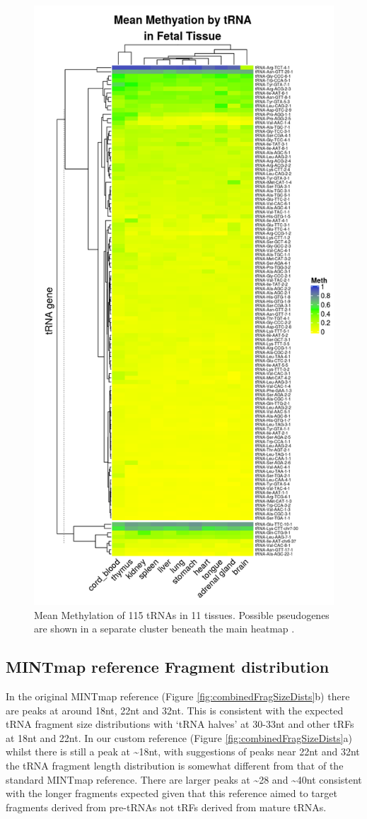 \documentclass[
]{book}
\begin{document}
\begin{figure}

{\centering \includegraphics[width=0.6\linewidth]{./figs/meanMethBytRNAByFetalTissueHeatmapPseudosplit} 

}

\caption{Mean Methylation of 115 tRNAs in 11 tissues. Possible pseudogenes are shown in a separate cluster beneath the main heatmap \citep{Gu2016}.}\label{fig:meanMethBytRNAByFetalTissueHeatmap}
\end{figure}



\hypertarget{mintmap-reference-fragment-distribution}{%
\subsection{MINTmap reference Fragment distribution}\label{mintmap-reference-fragment-distribution}}

In the original MINTmap reference (Figure \ref{fig:combinedFragSizeDists}b) there are peaks at around 18nt, 22nt and 32nt.
This is consistent with the expected tRNA fragment size distributions with `tRNA halves' at 30-33nt and other tRFs at 18nt and 22nt.
In our custom reference (Figure \ref{fig:combinedFragSizeDists}a) whilst there is still a peak at \textasciitilde18nt, with suggestions of peaks near 22nt and 32nt the tRNA fragment length distribution is somewhat different from that of the standard MINTmap reference.
There are larger peaks at \textasciitilde28 and \textasciitilde40nt consistent with the longer fragments expected given that this reference aimed to target fragments derived from pre-tRNAs not tRFs derived from mature tRNAs.
\end{document}
